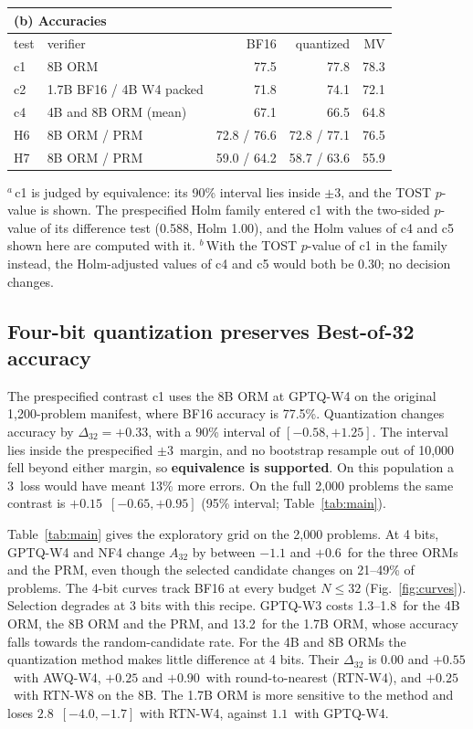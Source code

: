 \begin{table}[p]
\smallskip
{\scriptsize
\begin{tabular}{llrrr}
\multicolumn{5}{l}{(b) Accuracies}\\
\toprule
test & verifier & BF16 & quantized & MV \\
\midrule
c1 & 8B ORM & 77.5 & 77.8 & 78.3 \\
c2 & 1.7B BF16 / 4B W4 packed & 71.8 & 74.1 & 72.1 \\
c4 & 4B and 8B ORM (mean) & 67.1 & 66.5 & 64.8 \\
H6 & 8B ORM / PRM & 72.8 / 76.6 & 72.8 / 77.1 & 76.5 \\
H7 & 8B ORM / PRM & 59.0 / 64.2 & 58.7 / 63.6 & 55.9 \\
\bottomrule
\end{tabular}}

\smallskip
\parbox{\linewidth}{\scriptsize $^a$\,c1 is judged by equivalence: its 90\% interval lies
inside $\pm3$\pp, and the TOST $p$-value is shown. The prespecified Holm family entered c1
with the two-sided $p$-value of its difference test (0.588, Holm 1.00), and the Holm values
of c4 and c5 shown here are computed with it. $^b$\,With the TOST $p$-value of c1 in the
family instead, the Holm-adjusted values of c4 and c5 would both be 0.30; no decision
changes.}
\end{table}

\subsection{Four-bit quantization preserves Best-of-32 accuracy}\label{sec:equivalence}

The prespecified contrast c1 uses the 8B ORM at GPTQ-W4 on the original 1,200-problem
manifest, where BF16 accuracy is 77.5\%. Quantization changes accuracy by $\Delta_{32} =
+0.33$\pp, with a 90\% interval of $[-0.58, +1.25]$. The interval lies inside the
prespecified $\pm3$\pp\ margin, and no bootstrap resample out of 10,000 fell beyond
either margin, so \textbf{equivalence is supported}. On this population a 3\pp\ loss
would have meant 13\% more errors. On the full 2,000 problems the same contrast is
$+0.15$\pp\ $[-0.65, +0.95]$ (95\% interval; Table~\ref{tab:main}).

Table~\ref{tab:main} gives the exploratory grid on the 2,000 problems. At 4 bits,
GPTQ-W4 and NF4 change $A_{32}$ by between $-1.1$ and $+0.6$\pp\ for the three ORMs and
the PRM, even though the selected candidate changes on 21--49\% of problems. The 4-bit
curves track BF16 at every budget $N\le32$ (Fig.~\ref{fig:curves}). Selection degrades
at 3 bits with this recipe. GPTQ-W3 costs 1.3--1.8\pp\ for the 4B ORM, the 8B ORM and
the PRM, and 13.2\pp\ for the 1.7B ORM, whose accuracy falls towards the
random-candidate rate. For the 4B and 8B ORMs the quantization method makes little
difference at 4 bits. Their $\Delta_{32}$ is $0.00$ and $+0.55$\pp\ with AWQ-W4, $+0.25$
and $+0.90$\pp\ with round-to-nearest (RTN-W4), and $+0.25$\pp\ with RTN-W8 on the 8B.
The 1.7B ORM is more sensitive to the method and loses $2.8$\pp\ $[-4.0, -1.7]$ with
RTN-W4, against $1.1$\pp\ with GPTQ-W4.


